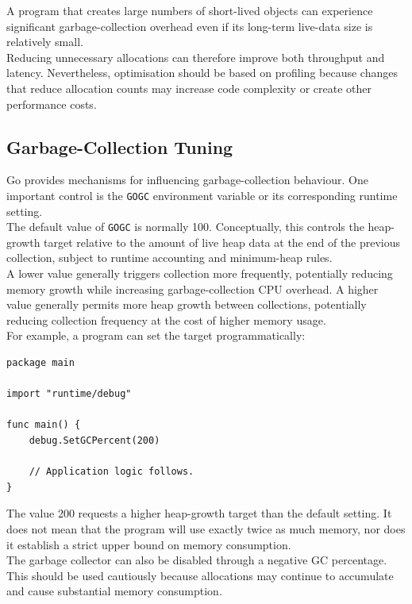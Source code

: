 A program that creates large numbers of short-lived objects can experience significant garbage-collection overhead even if its long-term live-data size is relatively small.\\

Reducing unnecessary allocations can therefore improve both throughput and latency. Nevertheless, optimisation should be based on profiling because changes that reduce allocation counts may increase code complexity or create other performance costs.

\subsection{Garbage-Collection Tuning}

Go provides mechanisms for influencing garbage-collection behaviour. One important control is the \texttt{GOGC} environment variable or its corresponding runtime setting.\\

The default value of \texttt{GOGC} is normally 100. Conceptually, this controls the heap-growth target relative to the amount of live heap data at the end of the previous collection, subject to runtime accounting and minimum-heap rules.\\

A lower value generally triggers collection more frequently, potentially reducing memory growth while increasing garbage-collection CPU overhead. A higher value generally permits more heap growth between collections, potentially reducing collection frequency at the cost of higher memory usage.\\

For example, a program can set the target programmatically:

\begin{lstlisting}
package main

import "runtime/debug"

func main() {
    debug.SetGCPercent(200)

    // Application logic follows.
}
\end{lstlisting}

The value 200 requests a higher heap-growth target than the default setting. It does not mean that the program will use exactly twice as much memory, nor does it establish a strict upper bound on memory consumption.\\

The garbage collector can also be disabled through a negative GC percentage. This should be used cautiously because allocations may continue to accumulate and cause substantial memory consumption.\\

